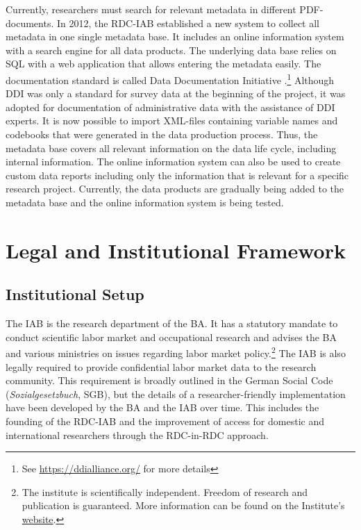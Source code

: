 Currently, researchers must search for relevant metadata in different PDF-documents. In 2012, the RDC-IAB established a new system to collect all metadata in one single metadata base. It includes an online information system with a search engine for all data products. The underlying data base relies on SQL with a web application that allows entering the metadata easily. The documentation standard is called Data Documentation Initiative \citep{vardigan2008}.\footnote{See \url{https://ddialliance.org/} for more details} Although DDI was only a standard for survey data at the beginning of the project, it was adopted for documentation of administrative data with the assistance of DDI experts. It is now possible to import XML-files containing variable names and codebooks that were generated in the data production process. Thus, the metadata base covers all relevant information on the data life cycle, including internal information. The online information system can also be used to create custom data reports including only the information that is relevant for a specific research project. Currently, the data products are gradually being added to the metadata base and the online information system is being tested.

\hypertarget{legal-and-institutional-framework}{%
\section{Legal and Institutional Framework}\label{legal-and-institutional-framework}}

\hypertarget{institutional-setup}{%
\subsection{Institutional Setup}\label{institutional-setup}}

The IAB is the research department of the BA. It has a statutory mandate to conduct scientific labor market and occupational research and advises the BA and various ministries on issues regarding labor market policy.\footnote{The institute is scientifically independent. Freedom of research and publication is guaranteed. More information can be found on the Institute's \href{https://www.iab.de/en/iab-aktuell.aspx}{website}.} The IAB is also legally required to provide confidential labor market data to the research community. This requirement is broadly outlined in the German Social Code (\emph{Sozialgesetzbuch}, SGB), but the details of a researcher-friendly implementation have been developed by the BA and the IAB over time. This includes the founding of the RDC-IAB and the improvement of access for domestic and international researchers through the RDC-in-RDC approach.

